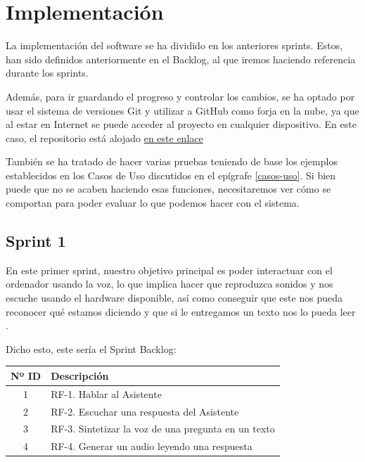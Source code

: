 \chapter{Implementación}

\noindent{}
\newline

La implementación del software se ha dividido en los anteriores sprints. Estos, han sido definidos anteriormente en el Backlog, al que iremos haciendo referencia durante los sprints.

Además, para ir guardando el progreso y controlar los cambios, se ha optado por usar el sistema de versiones Git y utilizar a GitHub como forja en la nube, ya que al estar en Internet se puede acceder al proyecto en cualquier dispositivo. En este caso, el repositorio está alojado \href{https://github.com/IvanitiX/TFG\_AsistenteVozModular}{en este enlace} 

También se ha tratado de hacer varias pruebas teniendo de base los ejemplos establecidos en los Casos de Uso discutidos en el epígrafe \ref{casos-uso}. Si bien puede que no se acaben haciendo esas funciones, necesitaremos ver cómo se comportan para poder evaluar lo que podemos hacer con el sistema.

\section{Sprint 1}
En este primer sprint, nuestro objetivo principal es poder interactuar con el ordenador usando la voz, lo que implica hacer que reproduzca sonidos y nos escuche usando el hardware disponible, así como conseguir que este nos pueda reconocer qué estamos diciendo y que si le entregamos un texto nos lo pueda leer .

Dicho esto, este sería el Sprint Backlog:
\begin{table}[H]
	\begin{tabularx}{\textwidth}{|c|X|}
		\hline
		{\cellcolor{mintgreen}} \textbf{Nº ID} & {\cellcolor{mintgreen}} \textbf{Descripción} \\
		\hline
		1 & RF-1. Hablar al Asistente \\
		\hline
		2 & RF-2. Escuchar una respuesta del Asistente \\
		\hline
		3 & RF-3. Sintetizar la voz de una pregunta en un texto \\
		\hline
		4 & RF-4. Generar un audio leyendo una respuesta \\
		\hline
	\end{tabularx}
\end{table}

